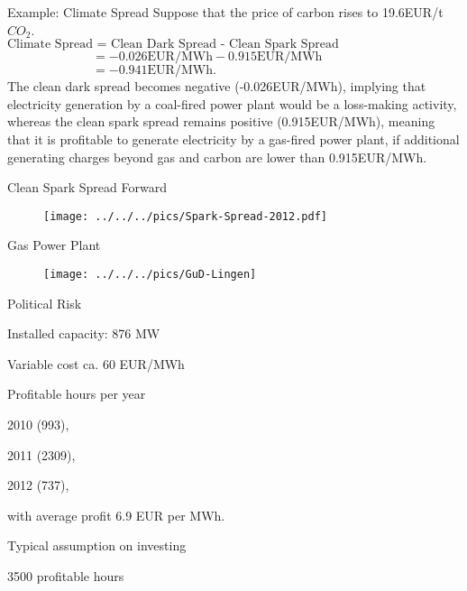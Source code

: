{Example: Climate Spread}
Suppose that the price of carbon rises to 19.6EUR/t$CO_2$.\\
\vspace{0.25cm}
$\text{Climate Spread = Clean Dark Spread - Clean Spark Spread}$\\
$\qquad\qquad\qquad\;\;\,=-0.026\text{EUR/MWh}-0.915\text{EUR/MWh}$\\
$\qquad\qquad\qquad\;\;\,=-0.941\text{EUR/MWh}.$\\
\vspace{0.25cm}
The clean dark spread becomes negative (-0.026EUR/MWh), implying that electricity generation by a coal-fired power plant would be a loss-making activity, whereas the clean spark spread remains positive (0.915EUR/MWh), meaning that it is profitable to generate electricity by a gas-fired power plant, if additional generating charges beyond gas and carbon are lower than 0.915EUR/MWh.

{Clean Spark Spread Forward}
\begin{figure}[htp]
\centering
\texttt{[image: ../../../pics/Spark-Spread-2012.pdf]}
\end{figure}


{Gas Power Plant}
\begin{figure}[htp]
\centering
\texttt{[image: ../../../pics/GuD-Lingen]}
\label{prices}
\end{figure}

{Political Risk}






	Installed capacity: 876 MW


	Variable cost ca. 60 EUR/MWh


	Profitable hours per year






	2010 (993),


	2011 (2309),


	2012 (737),




with average profit 6.9 EUR per MWh.


	Typical assumption on investing






	3500 profitable hours


